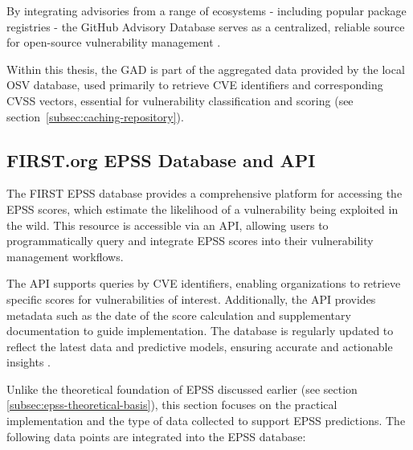 By integrating advisories from a range of ecosystems  -  including popular package registries  -  the GitHub Advisory Database serves as a centralized, reliable source for open-source vulnerability management \autocite{github_inc_about_2024}.

Within this thesis, the \ac{GAD} is part of the aggregated data provided by the local \ac{OSV} database, used primarily to retrieve \ac{CVE} identifiers and corresponding \ac{CVSS} vectors, essential for vulnerability classification and scoring (see section~\ref{subsec:caching-repository}).

\subsection{FIRST.org EPSS Database and API}
\label{subsec:first-epss-database}

The \ac{FIRST} \ac{EPSS} database provides a comprehensive platform for accessing the \ac{EPSS} scores, which estimate the likelihood of a vulnerability being exploited in the wild. This resource is accessible via an \ac{API}, allowing users to programmatically query and integrate \ac{EPSS} scores into their vulnerability management workflows.

The \ac{API} supports queries by \ac{CVE} identifiers, enabling organizations to retrieve specific scores for vulnerabilities of interest. Additionally, the \ac{API} provides metadata such as the date of the score calculation and supplementary documentation to guide implementation. The database is regularly updated to reflect the latest data and predictive models, ensuring accurate and actionable insights \cite{first_epss_2024}.

Unlike the theoretical foundation of \ac{EPSS} discussed earlier (see section \ref{subsec:epss-theoretical-basis}), this section focuses on the practical implementation and the type of data collected to support \ac{EPSS} predictions. The following data points are integrated into the \ac{EPSS} database:

